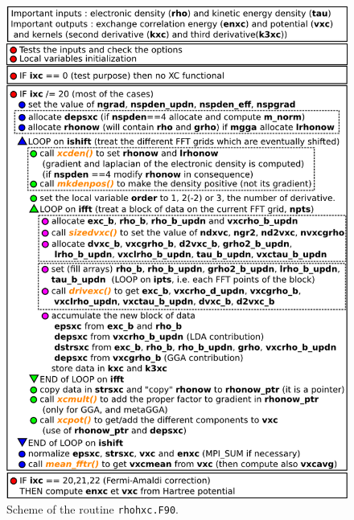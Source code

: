 \documentclass[a4paper,12pt]{report}
\begin{document}
\begin{figure}[!ht]
	\centering
	\includegraphics[width=\textwidth]{rhohxc}
	\caption{Scheme of the routine \texttt{rhohxc.F90}.}
	\label{figrhohxc}
\end{figure}
\end{document}
